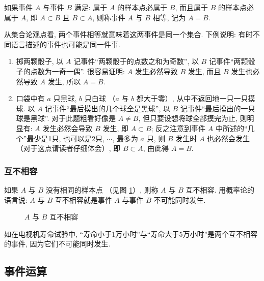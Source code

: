 如果事件 $A$ 与事件 $B$ 满足:
属于 $A$ 的样本点必属于 $B$,
而且属于 $B$ 的样本点必属于 $A$,
即 $ A \subset B $ 且 $ B \subset A$,
则称事件 $A$ 与 $B$ 相等,
记为 $A=B$.

从集合论观点看,
两个事件相等就意味着这两事件是同一个集合.
下例说明:
有时不同语言描述的事件也可能是同一件事.

\begin{example}
  \begin{enumerate}
    \item 掷两颗骰子,
    以 $A$ 记事件“两颗骰于的点数之和为奇数”,
    以 $B$ 记事件“两颗骰子的点数为一奇一偶”.
    很容易证明:
    $A$ 发生必然导致 $B$ 发生,
    而且 $B$ 发生也必然导致 $A$ 发生,
    所以 $A=B$.
    \item 口袋中有 $a$ 只黑球,
    $b$ 只白球 （$a$ 与 $b$ 都大于零）,
    从中不返回地一只一只摸球.
    以 $A$ 记事件“最后摸出的几个球全是黑球”,
    以 $B$ 记事件“最后摸出的一只球是黑球”.
    对于此题粗看好像是 $A \ne B$,
    但只要设想将球全部摸完为止,
    则明显有:
    $A$ 发生必然会导致 $B$ 发生,
    即 $ A \subset B $;
    反之注意到事件 $A$ 中所述的“几个”最少是1只,
    也可以是2只,
    $\cdots$,
    最多为 $a$ 只,
    则 $B$ 发生时 $A$ 也必然会发生 （对于这点请读者仔细体会）,
    即 $B \subset A$,
    由此得 $A=B$.
  \end{enumerate}
\end{example}

\subsubsection{互不相容}

如果 $A$ 与 $B$ 没有相同的样本点 （见图 \ref{fig1.1.4}）,
则称 $A$ 与 $B$ 互不相容.
用概率论的语言说:
$A$ 与 $B$ 互不相容就是事件 $A$ 与事件 $B$ 不可能同时发生.

\begin{figure}[!ht]
  \centering
  \caption{$A$ 与 $B$ 互不相容}\label{fig1.1.4}
\end{figure}

如在电视机寿命试验中,
“寿命小于1万小时”与“寿命大于5万小时”是两个互不相容的事件,
因为它们不可能同时发生.

\subsection{事件运算}

